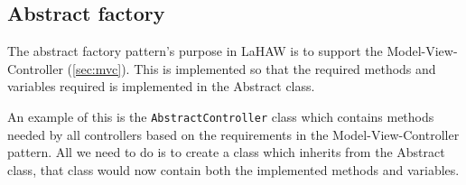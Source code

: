 











\subsection{Abstract factory}
\label{sec:absfac}
The abstract factory pattern's purpose in LaHAW is to support the Model-View-Controller (\ref{sec:mvc}). This is implemented so that the required methods and variables required is implemented in the Abstract class. 

An example of this is the \texttt{AbstractController} class which contains methods needed by all controllers based on the requirements in the Model-View-Controller pattern. 
All we need to do is to create a class which inherits from the Abstract class, that class would now contain both the implemented methods and variables.



